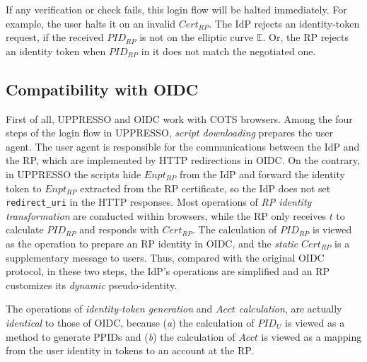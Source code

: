 If any verification or check fails,
     this login flow will be halted immediately.
For example, the user halts it
    on an invalid $Cert_{RP}$.
The IdP rejects an identity-token request, if the received $PID_{RP}$ is not on the elliptic curve $\mathbb{E}$.
Or, the RP rejects an identity token
    when $PID_{RP}$ in it does not match the negotiated one.



\subsection{Compatibility with OIDC}
\label{subsec:compatible}
First of all, UPPRESSO and OIDC work with COTS browsers.
Among the four steps of the login flow in UPPRESSO,
    \emph{script downloading} prepares the user agent.
The user agent is responsible for the communications between the IdP and the RP,
    which are implemented by HTTP redirections in OIDC.
On the contrary, in UPPRESSO the scripts hide $Enpt_{RP}$ from the IdP
    and forward the identity token to $Enpt_{RP}$ extracted from the RP certificate,
so the IdP does not set \verb+redirect_uri+ in the HTTP responses. %
Most operations of \emph{RP identity transformation} are conducted within browsers,
 while the RP only receives $t$ to calculate $PID_{RP}$ and responds with  $Cert_{RP}$.
The calculation of $PID_{RP}$ is viewed as the operation to prepare an RP identity in OIDC,
    and the \emph{static} $Cert_{RP}$ is a supplementary message to users.
Thus, compared with the original OIDC protocol, in these two steps, the IdP's operations are simplified
    and an RP customizes its \emph{dynamic} pseudo-identity.

The operations of \emph{identity-token generation} and \emph{$Acct$ calculation},
    are actually \emph{identical} to those of OIDC,
    because (\emph{a}) the calculation of $PID_U$ is viewed as a method to generate PPIDs
        and (\emph{b}) the calculation of $Acct$ is viewed as a mapping from the user identity in tokens
                    to an account at the RP.

